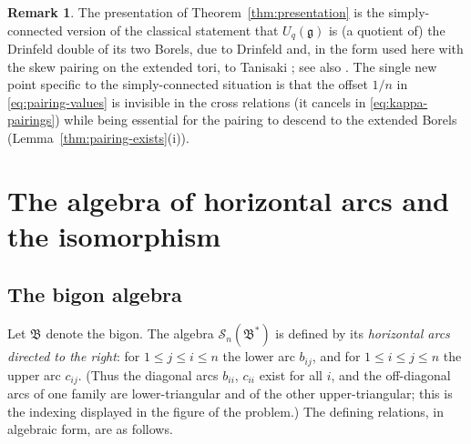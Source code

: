 \documentclass[11pt]{amsart}
\theoremstyle{plain}
\theoremstyle{definition}
\newtheorem{remark}[theorem]{Remark}
\numberwithin{equation}{section}
\begin{document}
\begin{remark}
The presentation of Theorem~\ref{thm:presentation} is the simply-connected
version of the classical statement that $U_q(\mathfrak g)$ is (a quotient of)
the Drinfeld double of its two Borels, due to Drinfeld and, in the form used
here with the skew pairing on the extended tori, to Tanisaki \cite{Tan};
see also \cite[\S 8]{KS}.  The single new point specific to the
simply-connected situation is that the offset $1/n$ in
\eqref{eq:pairing-values} is invisible in the cross relations (it cancels in
\eqref{eq:kappa-pairings}) while being essential for the pairing to descend
to the extended Borels (Lemma~\ref{thm:pairing-exists}(i)).
\end{remark}

\section{The algebra of horizontal arcs and the isomorphism}\label{sec:S}

\subsection{The bigon algebra}

Let $\mathfrak B$ denote the bigon.  The algebra
$\mathscr S_n(\mathfrak B^*)$ is defined by its \emph{horizontal arcs directed
to the right}: for $1\le j\le i\le n$ the lower arc $b_{ij}$, and for
$1\le i\le j\le n$ the upper arc $c_{ij}$.  (Thus the diagonal arcs $b_{ii}$,
$c_{ii}$ exist for all $i$, and the off-diagonal arcs of one family are
lower-triangular and of the other upper-triangular; this is the indexing
displayed in the figure of the problem.)  The defining relations, in
algebraic form, are as follows.
\end{document}
